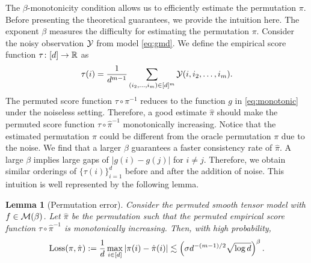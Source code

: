 \documentclass[12pt]{article}
\newtheorem{lem}{Lemma}
\theoremstyle{definition}
\begin{document}
The $\beta$-monotonicity condition allows us to efficiently estimate the permutation $\pi$. Before presenting the theoretical guarantees, we provide the intuition here. The exponent $\beta$ measures the difficulty for estimating the permutation $\pi$. Consider the noisy observation $\mathcal{Y}$ from model \eqref{eq:gmd}.
We define the empirical score function $\tau\colon [d]\rightarrow\mathbb{R}$ as
\begin{align}\label{eq:score}
    \tau(i) = \frac{1}{d^{m-1}}\sum_{(i_2,\ldots,i_m)\in[d]^m} \mathcal{Y}(i,i_2,\ldots,i_m).
\end{align}
The permuted score function $\tau\circ\pi^{-1}$ reduces to the function $g$ in \eqref{eq:monotonic} under the noiseless setting.
Therefore, a good estimate $\hat\pi$ should make the permuted score function $\tau\circ\hat\pi^{-1}$ monotonically increasing. Notice that the estimated permutation $\hat\pi$ could be different from the oracle permutation $\pi$ due to the noise. We find that a larger $\beta$ guarantees a faster consistency rate of $\hat\pi$. A large $\beta$ implies large gaps of $|g(i)-g(j)|$ for $i\neq j$. Therefore, we obtain similar orderings of $\{\tau(i)\}_{i=1}^d$ before and after the addition of noise. This intuition is well represented by the following lemma.
\begin{lem}[Permutation error]\label{lem:permute}
Consider the permuted smooth tensor model with $f\in \mathcal{M}(\beta)$. Let $\hat\pi$ be the permutation such that the permuted empirical score function $\tau\circ \hat\pi^{-1}$ is monotonically increasing. Then, with high probability, 
\begin{align}
    \textup{Loss}(\pi,\hat\pi):= \frac{1}{d}\max_{i\in[d]}|\pi(i)-\hat\pi(i)|\lesssim \left(\sigma d^{-(m-1)/2}\sqrt{\log d}\right)^{\beta}.
\end{align}
\end{lem}
\end{document}
